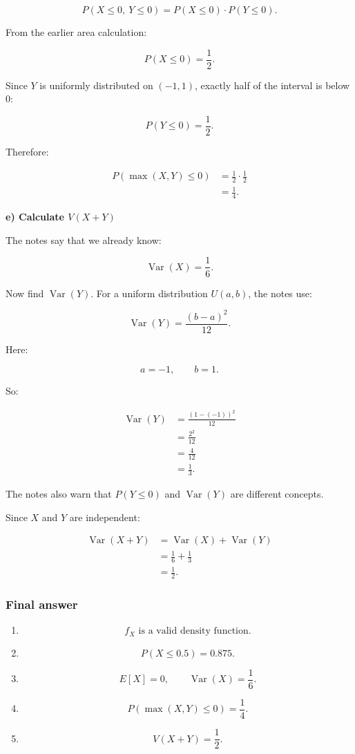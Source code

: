 \documentclass[10pt]{article}
\begin{document}
\[
P(X\le 0,\ Y\le 0)
=
P(X\le 0)\cdot P(Y\le 0).
\]

From the earlier area calculation:

\[
P(X\le 0)=\frac{1}{2}.
\]

Since \(Y\) is uniformly distributed on \((-1,1)\),
exactly half of the interval is below \(0\):

\[
P(Y\le 0)=\frac{1}{2}.
\]

Therefore:

\begin{align*}
P(\max(X,Y)\le 0)
&=
\frac{1}{2}\cdot\frac{1}{2} \\[2mm]
&=
\frac{1}{4}.
\end{align*}

\textbf{e) Calculate \(V(X+Y)\)}

The notes say that we already know:

\[
\operatorname{Var}(X)=\frac{1}{6}.
\]

Now find \(\operatorname{Var}(Y)\).
For a uniform distribution \(U(a,b)\), the notes use:

\[
\operatorname{Var}(Y)
=
\frac{(b-a)^2}{12}.
\]

Here:

\[
a=-1,
\qquad
b=1.
\]

So:

\begin{align*}
\operatorname{Var}(Y)
&=
\frac{(1-(-1))^2}{12} \\[2mm]
&=
\frac{2^2}{12} \\[2mm]
&=
\frac{4}{12} \\[2mm]
&=
\frac{1}{3}.
\end{align*}

The notes also warn that
\(P(Y\le 0)\) and \(\operatorname{Var}(Y)\)
are different concepts.

Since \(X\) and \(Y\) are independent:

\begin{align*}
\operatorname{Var}(X+Y)
&=
\operatorname{Var}(X)
+
\operatorname{Var}(Y) \\[2mm]
&=
\frac{1}{6}
+
\frac{1}{3} \\[2mm]
&=
\frac{1}{2}.
\end{align*}

\subsubsection*{Final answer}
\begin{enumerate}[label=\alph*)]
\item
\[
f_X
\text{ is a valid density function.}
\]

\item
\[
P(X\le 0.5)=0.875.
\]

\item
\[
E[X]=0,
\qquad
\operatorname{Var}(X)=\frac{1}{6}.
\]

\item
\[
P(\max(X,Y)\le 0)=\frac{1}{4}.
\]

\item
\[
V(X+Y)=\frac{1}{2}.
\]
\end{enumerate}
\end{document}
